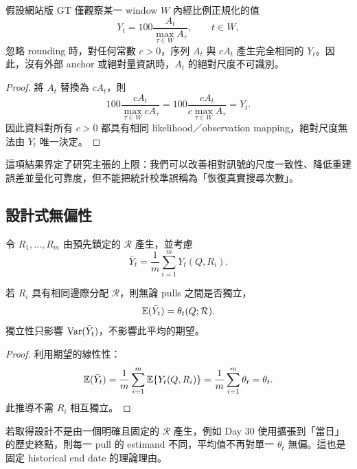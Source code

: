 \documentclass[12pt,a4paper,oneside]{article}
\begin{document}
\begin{proposition}[絕對尺度不可識別]
假設網站版 GT 僅觀察某一 window $W$ 內經比例正規化的值
\begin{equation}
Y_t=100\frac{A_t}{\max_{\tau\in W}A_\tau},\qquad t\in W,
\end{equation}
忽略 rounding 時，對任何常數 $c>0$，序列 $A_t$ 與 $cA_t$ 產生完全相同的 $Y_t$。因此，沒有外部 anchor 或絕對量資訊時，$A_t$ 的絕對尺度不可識別。
\end{proposition}

\begin{proof}
將 $A_t$ 替換為 $cA_t$，則
\[
100\frac{cA_t}{\max_{\tau\in W}cA_\tau}
=100\frac{cA_t}{c\max_{\tau\in W}A_\tau}
=Y_t.
\]
因此資料對所有 $c>0$ 都具有相同 likelihood／observation mapping，絕對尺度無法由 $Y_t$ 唯一決定。
\end{proof}

這項結果界定了研究主張的上限：我們可以改善相對訊號的尺度一致性、降低重建誤差並量化可靠度，但不能把統計校準誤稱為「恢復真實搜尋次數」。

\subsection{設計式無偏性}

令 $R_1,\ldots,R_m$ 由預先鎖定的 $\mathcal{R}$ 產生，並考慮
\begin{equation}
\bar Y_t=\frac{1}{m}\sum_{i=1}^{m}Y_t(Q,R_i).
\end{equation}

\begin{proposition}[對 GT 設計期望的無偏性]
若 $R_i$ 具有相同邊際分配 $\mathcal{R}$，則無論 pulls 之間是否獨立，
\begin{equation}
\mathbb{E}(\bar Y_t)=\theta_t(Q;\mathcal{R}).
\end{equation}
獨立性只影響 $\operatorname{Var}(\bar Y_t)$，不影響此平均的期望。
\end{proposition}

\begin{proof}
利用期望的線性性：
\[
\mathbb{E}(\bar Y_t)=\frac{1}{m}\sum_{i=1}^{m}\mathbb{E}\{Y_t(Q,R_i)\}
=\frac{1}{m}\sum_{i=1}^{m}\theta_t=\theta_t.
\]
此推導不需 $R_i$ 相互獨立。
\end{proof}

\begin{remark}
若取得設計不是由一個明確且固定的 $\mathcal{R}$ 產生，例如 Day 30 使用擴張到「當日」的歷史終點，則每一 pull 的 estimand 不同，平均值不再對單一 $\theta_t$ 無偏。這也是固定 historical end date 的理論理由。
\end{remark}
\end{document}
